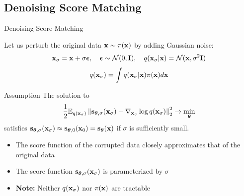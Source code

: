 \documentclass{beamer}
\begin{document}
\subsection{Denoising Score Matching}
\begin{frame}{Denoising Score Matching}

	Let us perturb the original data $\mathbf{x} \sim \pi(\mathbf{x})$ by adding Gaussian noise:
	\[
		\mathbf{x}_{\sigma} = \mathbf{x} + \sigma \boldsymbol{\epsilon}, \quad \boldsymbol{\epsilon} \sim \mathcal{N}(0, \mathbf{I}), \quad q(\mathbf{x}_{\sigma} | \mathbf{x}) = \mathcal{N}(\mathbf{x}, \sigma^2 \mathbf{I})
	\]
	\vspace{-0.4cm}
	\[
		q(\mathbf{x}_{\sigma}) = \int q(\mathbf{x}_{\sigma} | \mathbf{x}) \pi(\mathbf{x}) d\mathbf{x}
	\]
    \eqpause
	\vspace{-0.5cm} 
	\begin{block}{Assumption}
		The solution to
		\[
			\frac{1}{2} \mathbb{E}_{q(\mathbf{x}_{\sigma})}\left\| \mathbf{s}_{\boldsymbol{\theta}, \sigma}(\mathbf{x}_{\sigma}) - \nabla_{\mathbf{x}_{\sigma}} \log q(\mathbf{x}_{\sigma}) \right\|_2^2 \rightarrow \min_{\boldsymbol{\theta}}
		\]
		\vspace{-0.3cm}
		satisfies $\mathbf{s}_{\boldsymbol{\theta}, \sigma}(\mathbf{x}_{\sigma}) \approx \mathbf{s}_{\boldsymbol{\theta}, 0}(\mathbf{x}_0) = \mathbf{s}_{\boldsymbol{\theta}}(\mathbf{x})$ if $\sigma$ is sufficiently small.
	\end{block}
    \eqpause
	\begin{itemize}
		\item The score function of the corrupted data closely approximates that of the original data
		\item The score function $\mathbf{s}_{\boldsymbol{\theta}, \sigma}(\mathbf{x}_{\sigma})$ is parameterized by $\sigma$
		\item \textbf{Note:} Neither $q(\mathbf{x}_{\sigma})$ nor $\pi(\mathbf{x})$ are tractable
	\end{itemize}
\end{frame}
\end{document}
